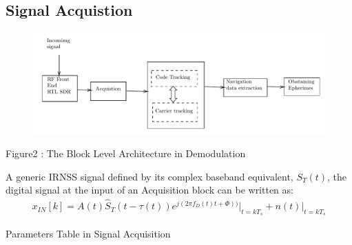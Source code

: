\subsection{Signal Acquistion}
\begin{normalsize}
\begin{figure}[!ht]%
\centering%
\includegraphics[scale=0.5]{figs/block2}
\end{figure} 

\end{normalsize}
\begin{center}
Figure2 : The Block Level Architecture in Demodulation
\end{center}
A generic IRNSS signal defined by its complex baseband equivalent, 
$S_T(t)$, the digital signal at the input of an Acquisition block can be written as:
\begin{align}
x_{IN}[k]=A(t)\hat S_T (t-\tau(t))e^{j(2 \pi f_D(t)t+\Phi))}\bigg|_{t=kT_s} +n(t)\bigg|_{t=kT_s}
\end{align}
\begin{table}[ht]
\centering
	\caption{\Large{Parameters Table in Signal Acquisition}}
	
\end{table}



